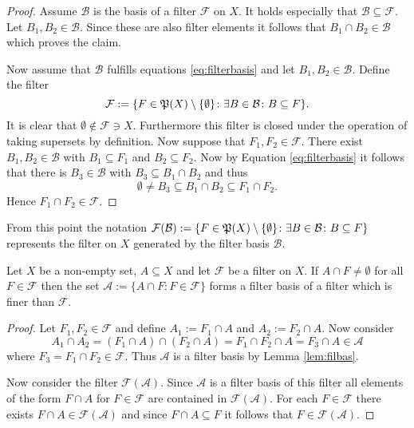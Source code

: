 \begin{proof}
  Assume $\mathcal{B}$ is the basis of a filter $\mathcal{F}$ on $X$. It holds especially that $\mathcal{B} \subseteq \mathcal{F}$. Let $B_1, B_2 \in \mathcal{B}$. Since these are also filter elements it follows that $B_1 \cap B_2 \in \mathcal{B}$ which proves the claim.

  Now assume that $\mathcal{B}$ fulfills equations \ref{eq:filterbasis} and let $B_1, B_2 \in \mathcal{B}$. Define the filter \[\mathcal{F} := \{ F \in \mathfrak{P}(X)\setminus\{ \emptyset \}\colon \exists B\in\mathcal{B}\colon B \subseteq F \}.\] It is clear that $\emptyset \notin \mathcal{F} \ni X$. Furthermore this filter is closed under the operation of taking supersets by definition. Now suppose that $F_1, F_2 \in \mathcal{F}$. There exist $B_1, B_2 \in \mathcal{B}$ with $B_1 \subseteq F_1$ and $B_2 \subseteq F_2$. Now by Equation \ref{eq:filterbasis} it follows that there is $B_3 \in \mathcal{B}$ with $B_3 \subseteq B_1 \cap B_2$ and thus
  \begin{equation*}
    \emptyset \neq B_3 \subseteq B_1 \cap B_2 \subseteq F_1 \cap F_2.
  \end{equation*}
  Hence $F_1 \cap F_2 \in \mathcal{F}$.
\end{proof}

From this point the notation $\mathcal{F}(\mathcal{B}) := \{F \in \mathfrak{P}(X)\setminus\{\emptyset\}\colon \exists B\in\mathcal{B}\colon B\subseteq F\}$ represents the filter on $X$ generated by the filter basis $\mathcal{B}$.

\begin{col}\label{cor:filbas}
  Let $X$ be a non-empty set, $A \subseteq X$ and let $\mathcal{F}$ be a filter on $X$. If $A \cap F \neq \emptyset$ for all $F\in\mathcal{F}$ then the set $\mathcal{A} := \{A \cap F\colon F\in \mathcal{F}\}$ forms a filter basis of a filter which is finer than $\mathcal{F}$.
\end{col}

\begin{proof}
  Let $F_1, F_2 \in \mathcal{F}$ and define $A_1 := F_1 \cap A$ and $A_2 := F_2 \cap A$. Now consider
  \begin{equation*}
    A_1 \cap A_2 = (F_1 \cap A) \cap (F_2 \cap A) = F_1 \cap F_2 \cap A = F_3 \cap A \in \mathcal{A}
  \end{equation*}
  where $F_3 = F_1 \cap F_2 \in \mathcal{F}$. Thus $\mathcal{A}$ is a filter basis by Lemma \ref{lem:filbas}.

  Now consider the filter $\mathcal{F}(\mathcal{A})$. Since $\mathcal{A}$ is a filter basis of this filter all elements of the form $F \cap A$ for $F\in\mathcal{F}$ are contained in $\mathcal{F}(\mathcal{A})$. For each $F\in\mathcal{F}$ there exists $F\cap A\in \mathcal{F}(\mathcal{A})$ and since $F\cap A \subseteq F$ it follows that $F\in \mathcal{F}(\mathcal{A})$. 
\end{proof}

